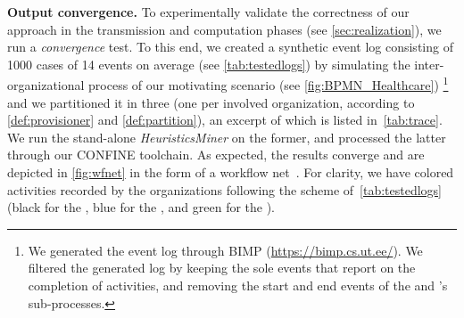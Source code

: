 \noindent\textbf{Output convergence.}
\label{sec:evaluation:subsec:convergence}
To experimentally validate the correctness of our approach in the transmission and computation phases (see \cref{sec:realization}), we run a \emph{convergence} test. %
To this end, we created a synthetic event log  consisting of \num{1000} cases of \num{14} events on average (see \cref{tab:testedlogs}) by simulating the inter-organizational process of our motivating scenario 
(see \cref{fig:BPMN_Healthcare})%
%
\footnote{We generated the event log through BIMP (\url{https://bimp.cs.ut.ee/}). We filtered the generated log by keeping the sole events that report on the completion of activities, and removing the start and end events of the  and 's sub-processes.}
%
and we partitioned it in three  (one per involved organization, according to \cref{def:provisioner} and \cref{def:partition}), an excerpt of which is listed in~\cref{tab:trace}.
We run the stand-alone \textit{HeuristicsMiner} on the former, and processed the latter through our CONFINE toolchain.
As expected, the results converge and are depicted in \cref{fig:wfnet} in the form of a workflow net~\citep{Aalst/ICATPN97:VerificationofWfNs}. For clarity, we have colored activities recorded by the organizations following the scheme of~\cref{tab:testedlogs} (black for the , blue for the , and green for the ).
%

